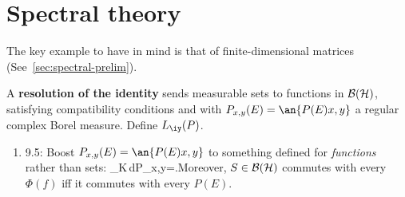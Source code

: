 \section{Spectral theory}
The key example to have in mind is that of finite-dimensional matrices (See~\ref{sec:spectral-prelim}). 

A \textbf{resolution of the identity} sends measurable sets to functions in $\cal B(H)$, satisfying compatibility conditions and with $P_{x,y}(E)=\an{P(E)x,y}$ a regular complex Borel measure. Define $L_{\iy}(P)$.
\begin{enumerate}
\item
9.5: Boost $P_{x,y}(E)=\an{P(E)x,y}$ to something defined for {\it functions} rather than sets: \int_K\,dP_{x,y}=.\eeq Moreover, $S\in \cal B(H)$ commutes with every $\Phi(f)$ iff it commutes with every $P(E)$.


\end{enumerate}
